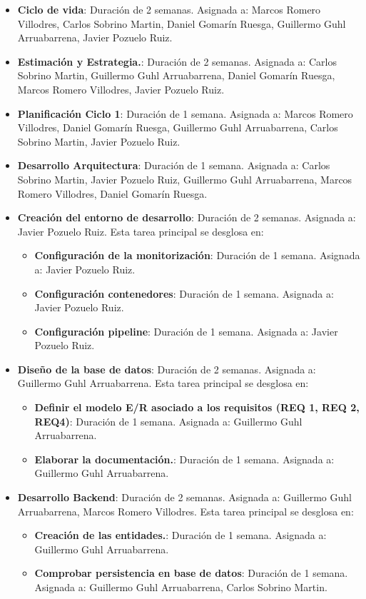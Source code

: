 \documentclass[12pt,a4paper,titlepage]{article}
\begin{document}
\begin{itemize}
    \item \textbf{Ciclo de vida}: Duración de 2 semanas. Asignada a: Marcos Romero Villodres, Carlos Sobrino Martin, Daniel Gomarín Ruesga, Guillermo Guhl Arruabarrena, Javier Pozuelo Ruiz.
    \item \textbf{Estimación y Estrategia.}: Duración de 2 semanas. Asignada a: Carlos Sobrino Martin, Guillermo Guhl Arruabarrena, Daniel Gomarín Ruesga, Marcos Romero Villodres, Javier Pozuelo Ruiz.
    \item \textbf{Planificación Ciclo 1}: Duración de 1 semana. Asignada a: Marcos Romero Villodres, Daniel Gomarín Ruesga, Guillermo Guhl Arruabarrena, Carlos Sobrino Martin, Javier Pozuelo Ruiz.
    \item \textbf{Desarrollo Arquitectura}: Duración de 1 semana. Asignada a: Carlos Sobrino Martin, Javier Pozuelo Ruiz, Guillermo Guhl Arruabarrena, Marcos Romero Villodres, Daniel Gomarín Ruesga.
    
    \item \textbf{Creación del entorno de desarrollo}: Duración de 2 semanas. Asignada a: Javier Pozuelo Ruiz. Esta tarea principal se desglosa en:
    \begin{itemize}
        \item \textbf{Configuración de la monitorización}: Duración de 1 semana. Asignada a: Javier Pozuelo Ruiz.
        \item \textbf{Configuración contenedores}: Duración de 1 semana. Asignada a: Javier Pozuelo Ruiz.
        \item \textbf{Configuración pipeline}: Duración de 1 semana. Asignada a: Javier Pozuelo Ruiz.
    \end{itemize}

    \item \textbf{Diseño de la base de datos}: Duración de 2 semanas. Asignada a: Guillermo Guhl Arruabarrena. Esta tarea principal se desglosa en:
    \begin{itemize}
        \item \textbf{Definir el modelo E/R asociado a los requisitos (REQ 1, REQ 2, REQ4)}: Duración de 1 semana. Asignada a: Guillermo Guhl Arruabarrena.
        \item \textbf{Elaborar la documentación.}: Duración de 1 semana. Asignada a: Guillermo Guhl Arruabarrena.
    \end{itemize}

    \item \textbf{Desarrollo Backend}: Duración de 2 semanas. Asignada a: Guillermo Guhl Arruabarrena, Marcos Romero Villodres. Esta tarea principal se desglosa en:
    \begin{itemize}
        \item \textbf{Creación de las entidades.}: Duración de 1 semana. Asignada a: Guillermo Guhl Arruabarrena.
        \item \textbf{Comprobar persistencia en base de datos}: Duración de 1 semana. Asignada a: Guillermo Guhl Arruabarrena, Carlos Sobrino Martin.
    \end{itemize}


\end{itemize}
\end{document}
